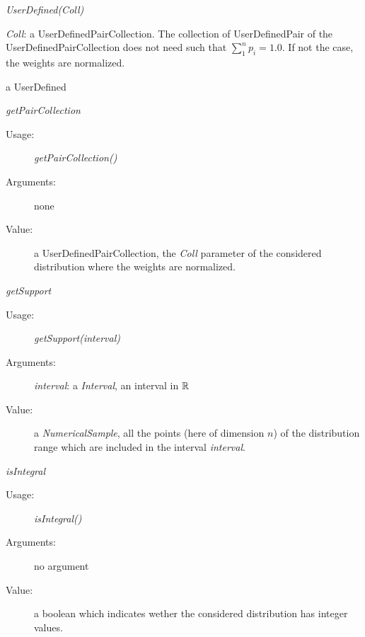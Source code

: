 \begin{description}

\item[Usage:] \textit{UserDefined(Coll)}

\item[Arguments:]  \textit{Coll}: a UserDefinedPairCollection. The collection of UserDefinedPair of the UserDefinedPairCollection does not need such that $\sum_1^n  p_i = 1.0$. If not the case, the weights are normalized.

\item[Value:] a UserDefined

\item[Some methods:]  \rule{0pt}{1em}
\begin{description}


\item \textit{getPairCollection}
\begin{description}
\item[Usage:] \textit{getPairCollection()}
\item[Arguments:] none
\item[Value:]  a UserDefinedPairCollection, the  \textit{Coll} parameter of the considered distribution where the weights are normalized.
\end{description}
\bigskip

\item \textit{getSupport}
\begin{description}
\item[Usage:] \textit{getSupport(interval)}
\item[Arguments:] \textit{interval}: a \textit{Interval}, an interval in ${\mathbb R}$
\item[Value:]  a \textit{NumericalSample}, all the points (here of dimension $n$) of the distribution range which are included in the interval \textit{interval}.
\end{description}
\bigskip

\item \textit{isIntegral}
\begin{description}
\item[Usage:] \textit{isIntegral()}
\item[Arguments:] no argument
\item[Value:] a boolean which indicates wether the considered distribution has integer values.
\end{description}

\end{description}


\end{description}

